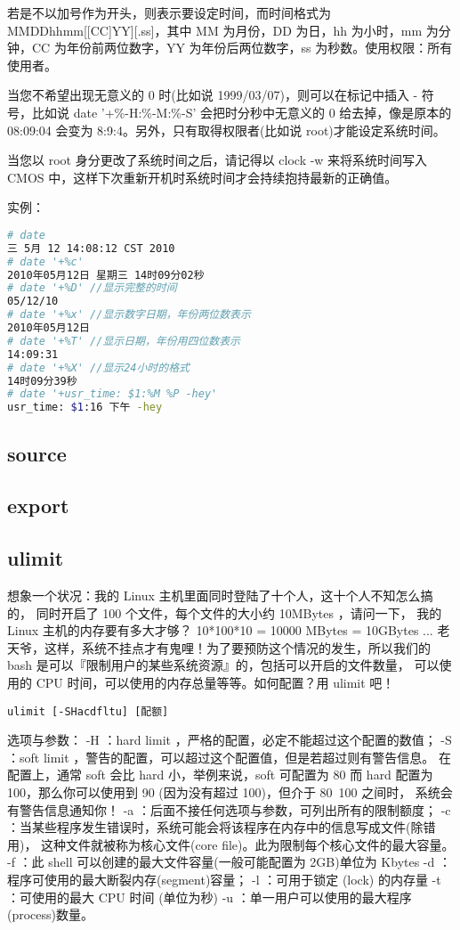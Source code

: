 若是不以加号作为开头，则表示要设定时间，而时间格式为 MMDDhhmm[[CC]YY][.ss]，其中 MM 为月份，DD 为日，hh 为小时，mm 为分钟，CC 为年份前两位数字，YY 为年份后两位数字，ss 为秒数。使用权限：所有使用者。

当您不希望出现无意义的 0 时(比如说 1999/03/07)，则可以在标记中插入 - 符号，比如说 date '+\%-H:\%-M:\%-S' 会把时分秒中无意义的 0 给去掉，像是原本的 08:09:04 会变为 8:9:4。另外，只有取得权限者(比如说 root)才能设定系统时间。

当您以 root 身分更改了系统时间之后，请记得以 clock -w 来将系统时间写入 CMOS 中，这样下次重新开机时系统时间才会持续抱持最新的正确值。

实例：
\begin{lstlisting}[language=sh]
# date
三 5月 12 14:08:12 CST 2010
# date '+%c' 
2010年05月12日 星期三 14时09分02秒
# date '+%D' //显示完整的时间
05/12/10
# date '+%x' //显示数字日期，年份两位数表示
2010年05月12日
# date '+%T' //显示日期，年份用四位数表示
14:09:31
# date '+%X' //显示24小时的格式
14时09分39秒
# date '+usr_time: $1:%M %P -hey'
usr_time: $1:16 下午 -hey
\end{lstlisting}



\subsection{source}
\subsection{export}



\subsection{ulimit}
想象一个状况：我的 Linux 主机里面同时登陆了十个人，这十个人不知怎么搞的， 同时开启了 100 个文件，每个文件的大小约 10MBytes ，请问一下， 我的 Linux 主机的内存要有多大才够？ 10*100*10 = 10000 MBytes = 10GBytes ... 老天爷，这样，系统不挂点才有鬼哩！为了要预防这个情况的发生，所以我们的 bash 是可以『限制用户的某些系统资源』的，包括可以开启的文件数量， 可以使用的 CPU 时间，可以使用的内存总量等等。如何配置？用 ulimit 吧！

\verb|ulimit [-SHacdfltu] [配额]|

选项与参数：
-H  ：hard limit ，严格的配置，必定不能超过这个配置的数值；
-S  ：soft limit ，警告的配置，可以超过这个配置值，但是若超过则有警告信息。
      在配置上，通常 soft 会比 hard 小，举例来说，soft 可配置为 80 而 hard 
      配置为 100，那么你可以使用到 90 (因为没有超过 100)，但介于 80~100 之间时，
      系统会有警告信息通知你！
-a  ：后面不接任何选项与参数，可列出所有的限制额度；
-c  ：当某些程序发生错误时，系统可能会将该程序在内存中的信息写成文件(除错用)，
      这种文件就被称为核心文件(core file)。此为限制每个核心文件的最大容量。
-f  ：此 shell 可以创建的最大文件容量(一般可能配置为 2GB)单位为 Kbytes
-d  ：程序可使用的最大断裂内存(segment)容量；
-l  ：可用于锁定 (lock) 的内存量
-t  ：可使用的最大 CPU 时间 (单位为秒)
-u  ：单一用户可以使用的最大程序(process)数量。


